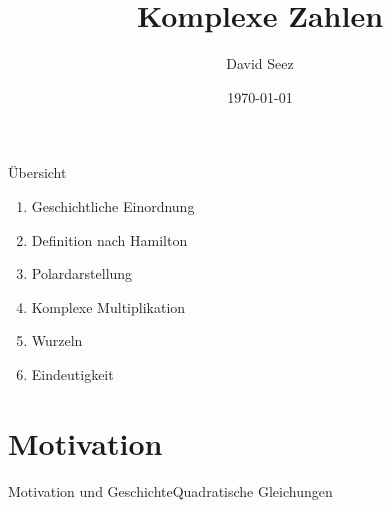 

\title{Komplexe Zahlen}
\subtitle{}
\author{David Seez}
\institute{}
\date{\today}



\begin{frame}
  \titlepage
\end{frame}

\begin{frame}{Übersicht}
\begin{enumerate}
  \item Geschichtliche Einordnung 
  \item Definition nach Hamilton
  \item Polardarstellung
  \item Komplexe Multiplikation
  \item Wurzeln
  \item Eindeutigkeit
\end{enumerate}
\end{frame}

\section{Motivation}



\begin{frame}{Motivation und Geschichte}{Quadratische Gleichungen}
  
\end{frame}

